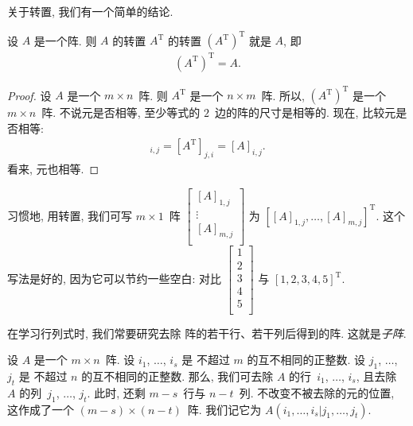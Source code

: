\documentclass[../libro.tex]{subfiles}
\begin{document}
关于转置, 我们有一个简单的结论.

\begin{theorem}
    设 \(A\) 是一个阵.
    则 \(A\) 的转置 \(A^{\mathrm{T}}\) 的转置
    \((A^{\mathrm{T}})^{\mathrm{T}}\)
    就是 \(A\),
    即
    \begin{align*}
        (A^{\mathrm{T}})^{\mathrm{T}} = A.
    \end{align*}
\end{theorem}

\begin{proof}
    设 \(A\) 是一个 \(m \times n\)~阵.
    则 \(A^{\mathrm{T}}\) 是一个 \(n \times m\)~阵.
    所以,
    \((A^{\mathrm{T}})^{\mathrm{T}}\) 是一个 \(m \times n\)~阵.
    不说元是否相等, 至少等式的 \(2\)~边的阵的尺寸是相等的.
    现在, 比较元是否相等:
    \begin{align*}
        [(A^{\mathrm{T}})^{\mathrm{T}}]_{i,j}
        = [A^{\mathrm{T}}]_{j,i}
        = [A]_{i,j}.
    \end{align*}
    看来, 元也相等.
\end{proof}

习惯地, 用转置, 我们可写 \(m \times 1\)~阵
\(
    \begin{bmatrix}
        [A]_{1,j} \\
        \vdots    \\
        [A]_{m,j} \\
    \end{bmatrix}
\)
为
\(
    [ [A]_{1,j}, \dots, [A]_{m,j} ]^{\mathrm{T}}
\).
这个写法是好的,
因为它可以节约一些空白:
对比
\(
    \begin{bmatrix}
        1 \\
        2 \\
        3 \\
        4 \\
        5 \\
    \end{bmatrix}
\)
与
\(
    [1, 2, 3, 4, 5]^{\mathrm{T}}
\).

\vspace{2ex}

在学习行列式时, 我们常要研究去除%
阵的若干行、若干列后得到的阵.
这就是\emph{子阵}.

\begin{definition}[子阵, 1]
    设 \(A\) 是一个 \(m \times n\)~阵.
    设 \(i_1\), \(\dots\), \(i_s\) 是%
    不超过 \(m\) 的互不相同的正整数.
    设 \(j_1\), \(\dots\), \(j_t\) 是%
    不超过 \(n\) 的互不相同的正整数.
    那么, 我们可去除 \(A\) 的行~\(i_1\), \(\dots\), \(i_s\),
    且去除 \(A\) 的列~\(j_1\), \(\dots\), \(j_t\).
    此时, 还剩 \(m - s\)~行与 \(n - t\)~列.
    不改变不被去除的元的位置,
    这作成了一个 \((m - s) \times (n - t)\)~阵.
    我们记它为
    \(A({i_1, \dots, i_s}|{j_1, \dots, j_t})\).
\end{definition}
\end{document}
